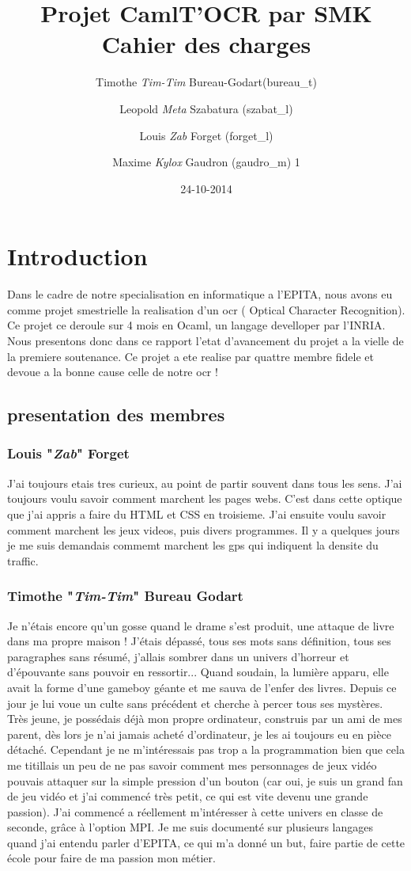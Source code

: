\documentclass{article}
\title{Projet CamlT'OCR par SMK \\ Cahier des charges}
\date{24-10-2014}
\author{
    Timothe \textit{Tim-Tim} Bureau-Godart(bureau\_t) \and
        Leopold \textit{Meta} Szabatura (szabat\_l) \and
        Louis \textit{Zab} Forget (forget\_l) \and
        Maxime \textit{Kylox} Gaudron (gaudro\_m)
        1      }
\begin{document}
\maketitle
\tableofcontents
\newpage
\section{Introduction}
Dans le cadre de notre specialisation en informatique a l'EPITA, nous avons eu comme projet smestrielle la realisation d'un ocr ( Optical Character Recognition). Ce projet ce deroule sur 4 mois en Ocaml, un langage develloper par l'INRIA. Nous presentons donc dans ce rapport l'etat d'avancement du projet a la vielle de la premiere soutenance. Ce projet a ete realise par quattre membre fidele et devoue a la bonne cause celle de notre ocr ! 
\subsection{presentation des membres}
\subsubsection{Louis "\textit{Zab}" Forget}
J'ai toujours etais tres curieux, au point de partir souvent dans tous les sens. J'ai toujours voulu savoir comment marchent les pages webs. C'est dans cette optique que j'ai appris a faire du HTML et CSS en troisieme. J'ai ensuite voulu savoir comment marchent les jeux videos, puis divers programmes. Il y a quelques jours je me suis demandais commemt marchent les gps qui indiquent la densite du traffic.
\subsubsection{Timothe "\textit{Tim-Tim}" Bureau Godart}
Je n'étais encore qu'un gosse quand le drame s'est produit, une attaque de livre dans ma propre maison ! J'étais dépassé, tous ses mots sans définition, tous ses paragraphes sans résumé, j'allais sombrer dans un univers d'horreur et d'épouvante sans pouvoir en ressortir... Quand soudain, la lumière apparu, elle avait la forme d'une gameboy géante et me sauva de l'enfer des livres. Depuis ce jour je lui voue un culte sans précédent et cherche à percer tous ses mystères.
Très jeune, je possédais déjà mon propre ordinateur, construis par un ami de mes parent, dès lors je n'ai jamais acheté d'ordinateur, je les ai toujours eu en pièce détaché. Cependant je ne m'intéressais pas trop a la programmation bien que cela me titillais un peu de ne pas savoir comment mes personnages de jeux vidéo pouvais attaquer sur la simple pression d'un bouton (car oui, je suis un grand fan de jeu vidéo et j'ai commencé très petit, ce qui est vite devenu une grande passion). J'ai commencé a réellement m'intéresser à cette univers en classe de seconde, grâce à l'option MPI. Je me suis documenté sur plusieurs langages quand j'ai entendu parler d'EPITA, ce qui m'a donné un but, faire partie de cette école pour faire de ma passion mon métier.
\end{document}
